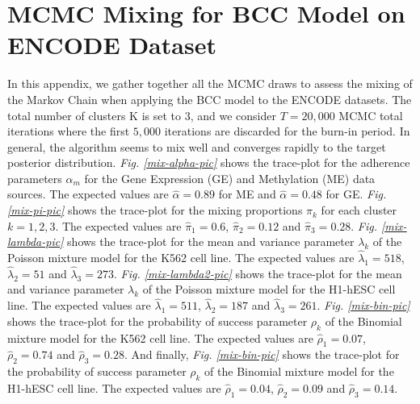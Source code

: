 \chapter{MCMC Mixing for BCC Model on ENCODE Dataset} \label{app-mcmc-mixing-chapter}
In this appendix, we gather together all the MCMC draws to assess the mixing of the Markov Chain when applying the BCC model to the ENCODE datasets. The total number of clusters K is set to 3, and we consider $T=20,000$ MCMC total iterations where the first $5,000$ iterations are discarded for the burn-in period. In general, the algorithm seems to mix well and converges rapidly to the target posterior distribution. \emph{Fig. \ref{mix-alpha-pic}} shows the trace-plot for the adherence parameters $\alpha_{m}$ for the Gene Expression (GE) and Methylation (ME) data sources. The expected values are $\hat{\alpha} = 0.89$ for ME and $\hat{\alpha} = 0.48$ for GE. \emph{Fig. \ref{mix-pi-pic}} shows the trace-plot for the mixing proportions $\pi_{k}$ for each cluster $k=1,2,3$. The expected values are $\hat{\pi}_{1}=0.6$, $\hat{\pi}_{2}=0.12$ and $\hat{\pi}_{3}=0.28$. \emph{Fig. \ref{mix-lambda-pic}} shows the trace-plot for the mean and variance parameter $\lambda_{k}$ of the Poisson mixture model for the K562 cell line. The expected values are $\hat{\lambda}_{1}=518$, $\hat{\lambda}_{2}=51$ and $\hat{\lambda}_{3}=273$. \emph{Fig. \ref{mix-lambda2-pic}} shows the trace-plot for the mean and variance parameter $\lambda_{k}$ of the Poisson mixture model for the H1-hESC cell line. The expected values are $\hat{\lambda}_{1}=511$, $\hat{\lambda}_{2}=187$ and $\hat{\lambda}_{3}=261$. \emph{Fig. \ref{mix-bin-pic}} shows the trace-plot for the probability of success parameter $\rho_{k}$ of the Binomial mixture model for the K562 cell line. The expected values are $\hat{\rho}_{1}=0.07$, $\hat{\rho}_{2}=0.74$ and $\hat{\rho}_{3}=0.28$. And finally, \emph{Fig. \ref{mix-bin-pic}} shows the trace-plot for the probability of success parameter $\rho_{k}$ of the Binomial mixture model for the H1-hESC cell line. The expected values are $\hat{\rho}_{1}=0.04$, $\hat{\rho}_{2}=0.09$ and $\hat{\rho}_{3}=0.14$.


